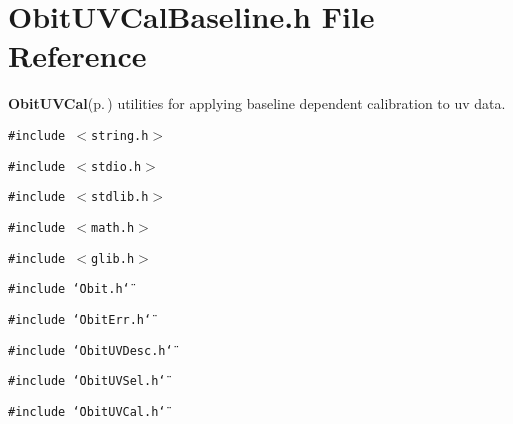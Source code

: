 \section{Obit\-UVCal\-Baseline.h File Reference}
\label{ObitUVCalBaseline_8h}
{\bf Obit\-UVCal}{\rm (p.\,\pageref{structObitUVCal})} utilities for applying baseline dependent calibration to uv data. 

{\tt \#include $<$string.h$>$}\par
{\tt \#include $<$stdio.h$>$}\par
{\tt \#include $<$stdlib.h$>$}\par
{\tt \#include $<$math.h$>$}\par
{\tt \#include $<$glib.h$>$}\par
{\tt \#include \char`\"{}Obit.h\char`\"{}}\par
{\tt \#include \char`\"{}Obit\-Err.h\char`\"{}}\par
{\tt \#include \char`\"{}Obit\-UVDesc.h\char`\"{}}\par
{\tt \#include \char`\"{}Obit\-UVSel.h\char`\"{}}\par
{\tt \#include \char`\"{}Obit\-UVCal.h\char`\"{}}\par
